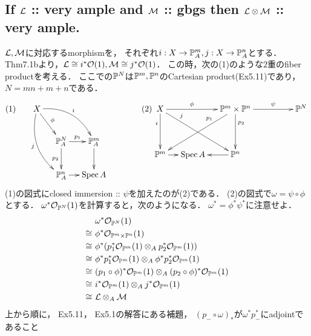 \documentclass[a4paper]{jsarticle}
\begin{document}
    \subsection{If $\mathcal{L}$ :: very ample and $\mathcal{M}$ :: gbgs then $\mathcal{L} \otimes \mathcal{M}$ :: very ample.}
    $\mathcal{L}, \mathcal{M}$に対応するmorphismを，
    それぞれ$i: X \to \mathbb{P}^m_A, j: X \to \mathbb{P}^n_A$とする．
    Thm7.1bより，$\mathcal{L} \cong i^* \mathcal{O}(1), \mathcal{M} \cong j^* \mathcal{O}(1)$．
    この時，次の(1)のような$2$重のfiber productを考える．
    ここでの$\mathbb{P}^N$は$\mathbb{P}^m, \mathbb{P}^n$のCartesian product(Ex5.11)であり，
    $N=mn+m+n$である．
    \[
        (1)
        \xymatrix@C=12pt
        {
            {} & X \ar@/^15pt/[rrd]^-{i}\ar@/_15pt/[ddr]_-{j}\ar[rd]^-{\phi}& {} &  {} \\
            {} & {} & \proj^{N}_A \ar[r]^-{p_1}\ar[d]_-{p_2}& \proj^m_A \ar[d] \\
            {} & {} & \proj^n_A \ar[r]& \Spec A
        }
        \hspace{40pt}
        (2)
        \xymatrix@C=12pt@R=40pt
        {
            X \ar[d]_(.3){i}\ar[rrd]^(.25){j}\ar[rr]^-{\phi}&
                {} &
                \proj^m \times \proj^n \ar[lld]_(.3){p_1}\ar[d]^(.3){p_2}\ar[rrr]^-{\psi}&
                {} &
                {} &
                \proj^N \\
            \proj^m \ar[r]& \Spec A &\ar[l] \proj^n & {} & {}
        }
    \]
    (1)の図式にclosed immersion :: $\psi$を加えたのが(2)である．
    (2)の図式で$\omega=\psi \circ \phi$とする．
    $\omega^*\mathcal{O}_{\mathbb{P}^N}(1)$を計算すると，次のようになる．
    $\omega^*=\phi^*\psi^*$に注意せよ．
    \begin{align*}
        {}&     ~\omega^*\mathcal{O}_{\mathbb{P}^N}(1) \\
        \cong&   ~\phi^*\mathcal{O}_{\mathbb{P}^m \times \mathbb{P}^n}(1) \\
        \cong&   ~\phi^* (p_1^* \mathcal{O}_{\mathbb{P}^m}(1) \otimes_A p_2^* \mathcal{O}_{\mathbb{P}^m}(1)) \\
        \cong&   ~\phi^* p_1^* \mathcal{O}_{\mathbb{P}^m}(1) \otimes_A \phi^* p_2^* \mathcal{O}_{\mathbb{P}^m}(1) \\
        \cong&   ~(p_1 \circ \phi)^* \mathcal{O}_{\mathbb{P}^m}(1) \otimes_A (p_2 \circ \phi)^* \mathcal{O}_{\mathbb{P}^m}(1) \\
        \cong&   ~i^* \mathcal{O}_{\mathbb{P}^m}(1) \otimes_A j^* \mathcal{O}_{\mathbb{P}^m}(1) \\
        \cong&   ~\mathcal{L} \otimes_A \mathcal{M}
    \end{align*}
    上から順に，
    Ex5.11，
    Ex5.1の解答にある補題，
    $(p_{-} \circ \omega)_*$が$\omega^* p_{-}^*$にadjointであること
\end{document}
